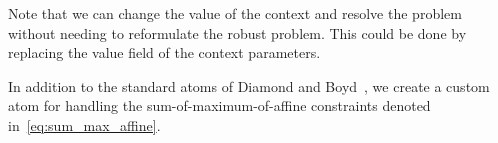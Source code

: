 Note that we can change the value of the context and resolve the problem without needing to reformulate the robust problem. This could be done by replacing the value field of the context parameters. 

In addition to the standard atoms of Diamond and Boyd~\cite{diamond2016cvxpy}, we create a custom atom for handling the sum-of-maximum-of-affine constraints denoted in~\eqref{eq:sum_max_affine}.

